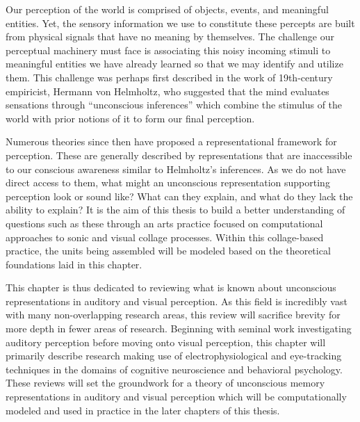 Our perception of the world is comprised of objects, events, and meaningful entities.  Yet, the sensory information we use to constitute these percepts are built from physical signals that have no meaning by themselves.  The challenge our perceptual machinery must face is associating this noisy incoming stimuli to meaningful entities we have already learned so that we may identify and utilize them.  This challenge was perhaps first described in the work of 19th-century empiricist, Hermann von Helmholtz, who suggested that the mind evaluates sensations through ``unconscious inferences'' which combine the stimulus of the world with prior notions of it to form our final perception. 

Numerous theories since then have proposed a representational framework for perception.  These are generally described by representations that are inaccessible to our conscious awareness similar to Helmholtz's inferences.  As we do not have direct access to them, what might an unconscious representation supporting perception look or sound like?  What can they explain, and what do they lack the ability to explain?  It is the aim of this thesis to build a better understanding of questions such as these through an arts practice focused on computational approaches to sonic and visual collage processes.  Within this collage-based practice, the units being assembled will be modeled based on the theoretical foundations laid in this chapter.  

This chapter is thus dedicated to reviewing what is known about unconscious representations in auditory and visual perception.  As this field is incredibly vast with many non-overlapping research areas, this review will sacrifice brevity for more depth in fewer areas of research.  Beginning with seminal work investigating auditory perception before moving onto visual perception, this chapter will primarily describe research making use of electrophysiological and eye-tracking techniques in the domains of cognitive neuroscience and behavioral psychology.  These reviews will set the groundwork for a theory of unconscious memory representations in auditory and visual perception which will be computationally modeled and used in practice in the later chapters of this thesis.   




